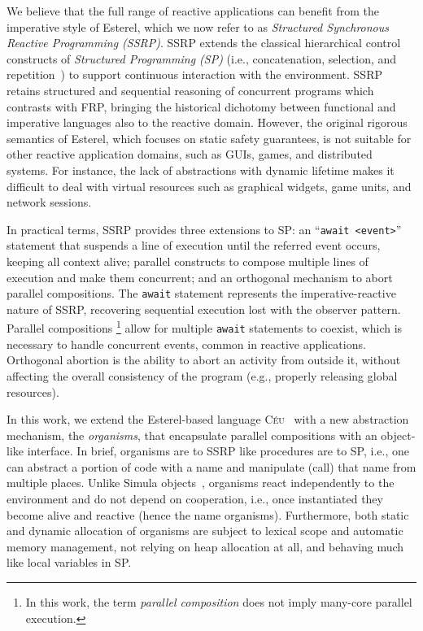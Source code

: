 \documentclass{acm_proc_article-sp}
\newcommand{\CEU}{\textsc{C\'{e}u}\xspace}
\newcommand{\code}[1] {{\small{\texttt{#1}}}}
\newcommand{\1}{\;}
\newcommand{\2}{\;\;}
\newcommand{\3}{\;\;\;}
\newcommand{\5}{\;\;\;\;\;}
\begin{document}
We believe that the full range of reactive applications can benefit from the 
imperative style of Esterel, which we now refer to as \emph{Structured 
Synchronous Reactive Programming (SSRP)}.
%
SSRP extends the classical hierarchical control constructs of \emph{Structured 
Programming (SP)} (i.e., concatenation, selection, and 
repetition~\cite{dij.notes}) to support continuous interaction with the 
environment.
%
SSRP retains structured and sequential reasoning of concurrent programs which 
contrasts with FRP, bringing the historical dichotomy between functional and 
imperative languages also to the reactive domain.
%
However, the original rigorous semantics of Esterel, which focuses on static 
safety guarantees, is not suitable for other reactive application domains, such 
as GUIs, games, and distributed systems.
%
For instance, the lack of abstractions with dynamic lifetime makes it difficult 
to deal with virtual resources such as graphical widgets, game units, and 
network sessions.

In practical terms, SSRP provides three extensions to SP:
an ``\code{await <event>}'' statement that suspends a line of execution until 
the referred event occurs, keeping all context alive;
parallel constructs to compose multiple lines of execution and make them 
concurrent;
and an orthogonal mechanism to abort parallel compositions.
%
The \code{await} statement represents the imperative-reactive nature of SSRP, 
recovering sequential execution lost with the observer pattern.
%
Parallel compositions%
\footnote{
In this work, the term \emph{parallel composition} does not imply many-core 
parallel execution.
}
allow for multiple \code{await} statements to coexist, which is necessary to 
handle concurrent events, common in reactive applications.
%
Orthogonal abortion is the ability to abort an activity from outside it, 
without affecting the overall consistency of the program (e.g., properly 
releasing global resources).

In this work, we extend the Esterel-based language \CEU~\cite{ceu.sensys13} 
with a new abstraction mechanism, the \emph{organisms}, that encapsulate 
parallel compositions with an object-like interface.
%
In brief, organisms are to SSRP like procedures are to SP, i.e., one can 
abstract a portion of code with a name and manipulate (call) that name from 
multiple places.
%
Unlike Simula objects~\cite{simula}, organisms react independently to the 
environment and do not depend on cooperation, i.e., once instantiated they 
become alive and reactive (hence the name organisms).
%
Furthermore, both static and dynamic allocation of organisms are subject to 
lexical scope and automatic memory management, not relying on heap allocation 
at all, and behaving much like local variables in SP.
%
\end{document}
